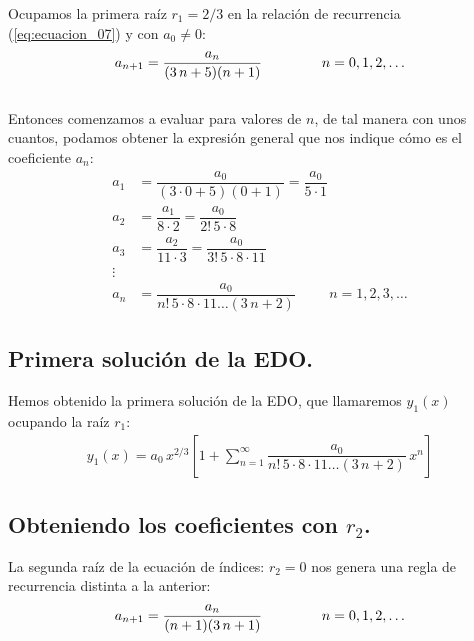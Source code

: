 Ocupamos la primera raíz $r_{1} = 2/3$ en la relación de recurrencia (\ref{eq:ecuacion_07}) y con $a_{0} \neq 0$:
\begin{align}
a_{n+1} = \dfrac{a_{n}}{(3 \, n + 5)(n + 1)} \hspace{1.5cm} n = 0, 1, 2, \ldots
\label{eq:ecuacion_08}    
\end{align}
\\
Entonces comenzamos a evaluar para valores de $n$, de tal manera con unos cuantos, podamos obtener la expresión general que nos indique cómo es el coeficiente $a_{n}$:
\begin{align*}
a_{1} &= \dfrac{a_{0}}{(3 \cdot 0 + 5)(0 + 1)}  = \dfrac{a_{0}}{5 \cdot 1} \\[0.5em] 
a_{2} &= \dfrac{a_{1}}{8 \cdot 2} = \dfrac{a_{0}}{2! \, 5 \cdot 8} \\[0.5em] 
a_{3} &= \dfrac{a_{2}}{11 \cdot 3} = \dfrac{a_{0}}{3! \, 5 \cdot 8 \cdot 11} \\
\vdots \\[0.5em] 
a_{n} &= \dfrac{a_{0}}{n! \, 5 \cdot 8 \cdot 11 \ldots (3\, n + 2)} \hspace{1cm} n = 1, 2, 3, \ldots
\end{align*}

\subsection*{Primera solución de la EDO.}

Hemos obtenido la primera solución de la EDO, que llamaremos $y_{1}(x)$ ocupando la raíz $r_{1}$:
\begin{align}
y_{1}(x) = a_{0} \, x^{2/3} \left[ 1 + \sum_{n=1}^{\infty} \dfrac{a_{0}}{n! \, 5 \cdot 8 \cdot 11 \ldots (3\, n + 2)} \, x^{n} \right]
\label{eq:ecuacion_10}    
\end{align}


\subsection*{Obteniendo los coeficientes con $r_{2}$.}

La segunda raíz de la ecuación de índices: $r_{2} = 0$ nos genera una regla de recurrencia distinta a la anterior:
\begin{align}
a_{n+1} = \dfrac{a_{n}}{(n+1)(3 \, n +1)} \hspace{1.5cm} n = 0, 1, 2, \ldots
\label{eq:ecuacion_09}    
\end{align}

